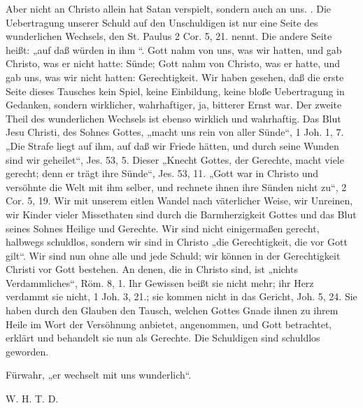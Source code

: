 Aber nicht an Christo allein hat Satan verspielt, sondern auch an uns. . Die Uebertragung unserer Schuld auf den Unschuldigen ist nur eine Seite des wunderlichen Wechsels, den St. Paulus 2 Cor. 5, 21. nennt. Die andere Seite heißt: „auf daß  würden in ihm “. Gott nahm von uns, was wir hatten, und gab Christo, was er nicht hatte: Sünde; Gott nahm von Christo, was er hatte, und gab uns, was wir nicht hatten: Gerechtigkeit. Wir haben gesehen, daß die erste Seite dieses Tausches kein Spiel, keine Einbildung, keine bloße Uebertragung in Gedanken, sondern wirklicher, wahrhaftiger, ja, bitterer Ernst war. Der zweite Theil des wunderlichen Wechsels ist ebenso wirklich und wahrhaftig. Das Blut Jesu Christi, des Sohnes Gottes, „macht uns rein von aller Sünde“, 1 Joh. 1, 7. „Die Strafe liegt auf ihm, auf daß wir Friede hätten, und durch seine Wunden sind wir geheilet“, Jes. 53, 5. Dieser „Knecht Gottes, der Gerechte, macht viele gerecht; denn er trägt ihre Sünde“, Jes. 53, 11. „Gott war in Christo und versöhnte die Welt mit ihm selber, und rechnete ihnen ihre Sünden nicht zu“, 2 Cor. 5, 19. Wir mit unserem eitlen Wandel nach väterlicher Weise, wir Unreinen, wir Kinder vieler Missethaten sind durch die Barmherzigkeit Gottes und das Blut seines Sohnes Heilige und Gerechte. Wir sind nicht einigermaßen gerecht, halbwegs schuldlos, sondern wir sind in Christo „die Gerechtigkeit, die vor Gott gilt“. Wir sind nun ohne alle und jede Schuld; wir können in der Gerechtigkeit Christi vor Gott bestehen. An denen, die in Christo sind, ist „nichts Verdammliches“, Röm. 8, 1. Ihr Gewissen beißt sie nicht mehr; ihr Herz verdammt sie nicht, 1 Joh. 3, 21.; sie kommen nicht in das Gericht, Joh. 5, 24. Sie haben durch den Glauben den Tausch, welchen Gottes Gnade ihnen zu ihrem Heile im Wort der Versöhnung anbietet, angenommen, und Gott betrachtet, erklärt und behandelt sie nun als Gerechte. Die Schuldigen sind schuldlos geworden.

Fürwahr, „er wechselt mit uns wunderlich“.

W. H. T. D.
